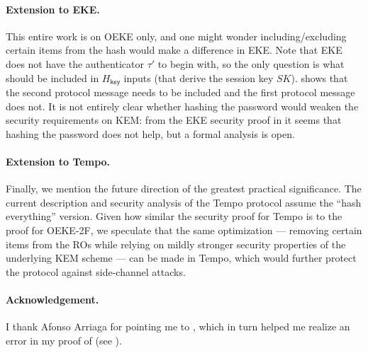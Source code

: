 \documentclass{article}
\theoremstyle{plain}
\theoremstyle{definition}
\theoremstyle{remark}
\newcommand{\bibprolog}[1]{
  \def\printbibprolog{
#1
}
}
\def\printbibprolog{} %
\newcommand{\Hkey}{H_\mathsf{key}}
\begin{document}
\paragraph{Extension to EKE.}
This entire work is on OEKE only, and one might wonder including/excluding certain items from the hash would make a difference in EKE. Note that EKE does not have the authenticator $\tau'$ to begin with, so the only question is what should be included in $\Hkey$ inputs (that derive the session key $SK$). \cite[Appendix~A.4]{EC:JanRoyXu25} shows that the second protocol message needs to be included and the first protocol message does not. It is not entirely clear whether hashing the password would weaken the security requirements on KEM: from the EKE security proof in \cite{EC:JanRoyXu25} it seems that hashing the password does not help, but a formal analysis is open.

\paragraph{Extension to Tempo.}
Finally, we mention the future direction of the greatest practical significance. The current description and security analysis of the Tempo protocol \cite[Figure~2]{TCHES:ArrBarJar26} assume the ``hash everything'' version. Given how similar the security proof for Tempo is to the proof for OEKE-2F, we speculate that the same optimization --- removing certain items from the ROs while relying on mildly stronger security properties of the underlying KEM scheme --- can be made in Tempo, which would further protect the protocol against side-channel attacks.

\paragraph{Acknowledgement.}
I thank Afonso Arriaga for pointing me to \cite{RSA:AMORS26}, which in turn helped me realize an error in my proof of  (see ).


\bibprolog{When we cite (say) \cite[Definition~9]{RSA:AbdBelRog01}, we always refer to the full version (if available) rather than the proceedings version.}

\newpage
\appendix
\end{document}
